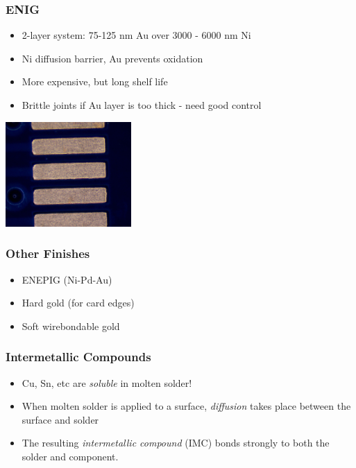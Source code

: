 \documentclass{beamer}
\begin{document}
\begin{frame}
\frametitle{ENIG}
\begin{itemize}
\item 2-layer system: 75-125 nm Au over 3000 - 6000 nm Ni
\item Ni diffusion barrier, Au prevents oxidation
\item More expensive, but long shelf life
\item Brittle joints if Au layer is too thick - need good control
\end{itemize}
\begin{center}
\includegraphics[height=4cm,keepaspectratio]{enig.jpg}
\end{center}
\end{frame}

\begin{frame}
\frametitle{Other Finishes}
\begin{itemize}
\item ENEPIG (Ni-Pd-Au)
\item Hard gold (for card edges)
\item Soft wirebondable gold
\end{itemize}
\end{frame}

\begin{frame}
\frametitle{Intermetallic Compounds}
\begin{itemize}
\item Cu, Sn, etc are \emph{soluble} in molten solder!
\item When molten solder is applied to a surface, \emph{diffusion} takes place between the surface and solder
\item The resulting \emph{intermetallic compound} (IMC) bonds strongly to both the solder and component.
\end{itemize}
\end{frame}
\end{document}
